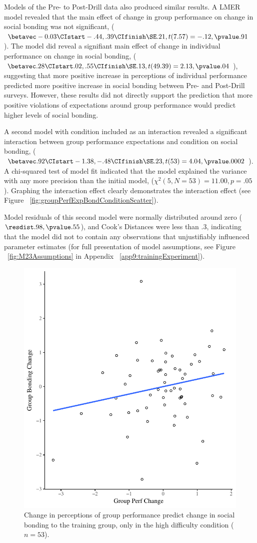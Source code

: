 

Models of the Pre- to Post-Drill data also produced similar results.  A LMER model revealed that the main effect of change in group performance on change in social bonding was not significant, ($\betavec -0.03 \CIstart -.44, .39 \CIfinish \SE .21, t(7.57) = -.12, \pvalue .91$). The model did reveal a signifiant main effect of change in individual performance on change in social bonding, ($\betavec .28 \CIstart .02, .55 \CIfinish \SE .13, t(49.39) = 2.13, \pvalue .04$), suggesting that more positive increase in perceptions of individual performance predicted more positive increase in social bonding between Pre- and Post-Drill surveys.  However, these results did not directly support the prediction that more positive violations of expectations around group performance would predict higher levels of social bonding.

A second model with condition included as an interaction revealed a significant interaction between group performance expectations and condition on social bonding, ($\betavec .92 \CIstart -1.38, -.48 \CIfinish \SE .23, t(53) = 4.04, \pvalue .0002$).  A chi-squared test of model fit indicated that the model explained the variance with any more precision than the initial model, ($\chi^2 (5, N = 53) = 11.00, p = .05$).  Graphing the interaction effect clearly demonstrates the interaction effect (see Figure ~\ref{fig:groupPerfExpBondConditionScatter}).

Model residuals of this second model were normally distributed around zero ($\resdist .98, \pvalue .55$), and Cook's Distances were less than $.3$, indicating that the model did not to contain any observations that unjustifiably influenced parameter estimates (for full presentation of model assumptions, see Figure ~\ref{fig:M23Assumptions} in Appendix ~\ref{app9:trainingExperiment}).

\begin{figure}
  \centering
  \includegraphics[width=0.5\linewidth,keepaspectratio] {images/groupPerfBondingChangeCondition}
  \caption{Change in perceptions of group performance predict change in social bonding to the training group, only in the high difficulty condition ($n = 53$).  }
 \label{fig:groupPerfBondingChangeCondition}
\end{figure}

